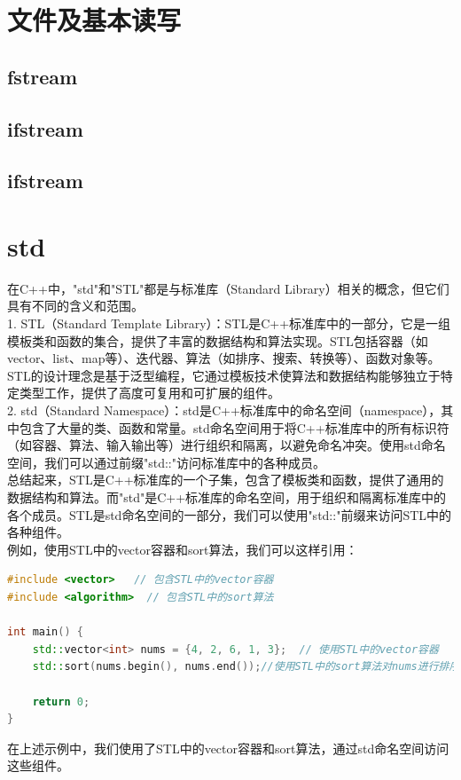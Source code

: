 \documentclass[12pt,twiside,a4paper]{ctexbook}
\numberwithin{chapter}{part}
\begin{document}
\chapter{文件及基本读写}
\section{fstream}
\section{ifstream}
\section{ifstream}

\chapter{std}
在C++中，"std"和"STL"都是与标准库（Standard Library）相关的概念，但它们具有不同的含义和范围。\\
1. STL（Standard Template Library）：STL是C++标准库中的一部分，它是一组模板类和函数的集合，提供了丰富的数据结构和算法实现。STL包括容器（如vector、list、map等）、迭代器、算法（如排序、搜索、转换等）、函数对象等。STL的设计理念是基于泛型编程，它通过模板技术使算法和数据结构能够独立于特定类型工作，提供了高度可复用和可扩展的组件。\\
2. std（Standard Namespace）：std是C++标准库中的命名空间（namespace），其中包含了大量的类、函数和常量。std命名空间用于将C++标准库中的所有标识符（如容器、算法、输入输出等）进行组织和隔离，以避免命名冲突。使用std命名空间，我们可以通过前缀"std::"访问标准库中的各种成员。\\
总结起来，STL是C++标准库的一个子集，包含了模板类和函数，提供了通用的数据结构和算法。而"std"是C++标准库的命名空间，用于组织和隔离标准库中的各个成员。STL是std命名空间的一部分，我们可以使用"std::"前缀来访问STL中的各种组件。\\
例如，使用STL中的vector容器和sort算法，我们可以这样引用：\\
\begin{lstlisting}[language=C++]
#include <vector>   // 包含STL中的vector容器
#include <algorithm>  // 包含STL中的sort算法

int main() {
    std::vector<int> nums = {4, 2, 6, 1, 3};  // 使用STL中的vector容器
    std::sort(nums.begin(), nums.end());//使用STL中的sort算法对nums进行排序

    return 0;
}
\end{lstlisting}
在上述示例中，我们使用了STL中的vector容器和sort算法，通过std命名空间访问这些组件。
\end{document}
